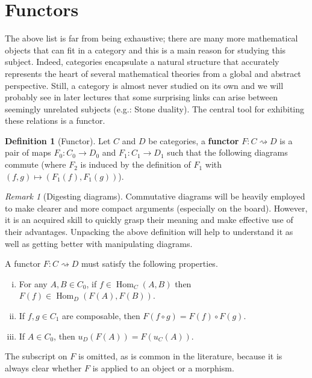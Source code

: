 \documentclass{article}
\theoremstyle{definition}
\newtheorem{defn}[thm]{Definition}
\theoremstyle{remark}
\newtheorem{rem}[thm]{Remark}
\DeclareMathOperator{\Hom}{Hom}
\begin{document}
\section{Functors}
The above list is far from being exhaustive; there are many more mathematical objects that can fit in a category and this is a main reason for studying this subject. Indeed, categories encapsulate a natural structure that accurately represents the heart of several mathematical theories from a global and abstract perspective. Still, a category is almost never studied on its own and we will probably see in later lectures that some surprising links can arise between seemingly unrelated subjects (e.g.: Stone duality). The central tool for exhibiting these relations is a functor.
\begin{defn}[Functor]
	Let $C$ and $D$ be categories, a \textbf{functor} $F: C \rightsquigarrow D$ is a pair of maps $F_0:C_0 \rightarrow D_0$ and $F_1:C_1 \rightarrow D_1$ such that the following diagrams commute (where $F_2$ is induced by the definition of $F_1$ with $(f,g) \mapsto (F_1(f), F_1(g))$).
	\begin{figure}[h]
		\centering
		\qquad 
		\qquad
	\end{figure}
\end{defn}
\begin{rem}[Digesting diagrams]
	Commutative diagrams will be heavily employed to make clearer and more compact arguments (especially on the board). However, it is an acquired skill to quickly grasp their meaning and make effective use of their advantages. Unpacking the above definition will help to understand it as well as getting better with manipulating diagrams.
	
	A functor $F:C\rightsquigarrow D$ must satisfy the following properties.
	\begin{enumerate}[i.]
		\item For any $A, B \in C_0$, if $f \in \Hom_C(A,B)$ then $F(f) \in \Hom_D(F(A), F(B))$.
		\item If $f,g \in C_1$ are composable, then $F(f\circ g) = F(f) \circ F(g)$.
		\item If $A \in C_0$, then $u_D(F(A)) = F(u_C(A))$.
	\end{enumerate}
	The subscript on $F$ is omitted, as is common in the literature, because it is always clear whether $F$ is applied to an object or a morphism.
\end{rem}
\end{document}
